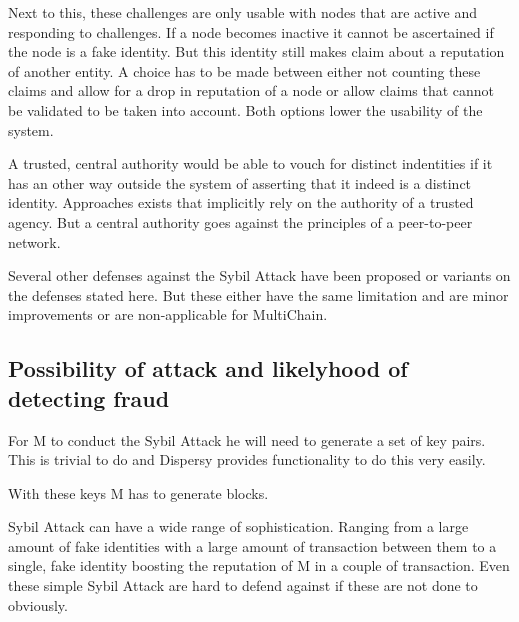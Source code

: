 Next to this, these challenges are only usable with nodes that are active and responding to challenges.
If a node becomes inactive it cannot be ascertained if the node is a fake identity.
But this identity still makes claim about a reputation of another entity.
A choice has to be made between either not counting these claims and allow for a drop in reputation of a node or
allow claims that cannot be validated to be taken into account.
Both options lower the usability of the system.

A trusted, central authority would be able to vouch for distinct indentities
if it has an other way outside the system of asserting that it indeed is a distinct identity.
Approaches exists that implicitly rely on the authority of a trusted agency.
But a central authority goes against the principles of a peer-to-peer network.

Several other defenses against the Sybil Attack have been proposed\cite{newsome-sybil}\cite{dinger-sybil}
or variants on the defenses stated here\cite{levine-sybilsurvey}.
But these either have the same limitation and are minor improvements or are non-applicable for MultiChain.

\subsection{Possibility of attack and likelyhood of detecting fraud}
For M to conduct the Sybil Attack he will need to generate a set of key pairs.
This is trivial to do and Dispersy provides functionality to do this very easily.


With these keys M has to generate blocks.


Sybil Attack can have a wide range of sophistication.
Ranging from a large amount of fake identities with a large amount of transaction between them
to a single, fake identity boosting the reputation of M in a couple of transaction.
Even these simple Sybil Attack are hard to defend against if these are not done to obviously.



